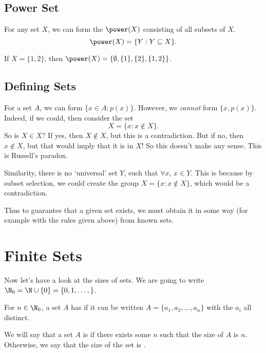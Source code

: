 \documentclass[a4paper]{scrreprt}
\begin{document}
\subsection{Power Set}
\vspace{\baselineskip}
\begin{definition}
	For any set $X$, we can form the  $\power(X)$ consisting of all subsets of $X$.
	$$
	\power(X) = \{Y : Y \subseteq X\}.
	$$
\end{definition}

\begin{example}
	If $X = \{1, 2\}$, then $\power(X) = \{\emptyset, \{1\}, \{2\}, \{1, 2\}\}$.
\end{example}


\subsection{Defining Sets}

For a set $A$, we can form $\{x \in A : p(x) \}$.
However, we \emph{cannot} form $\{x, p(x)\}$.
Indeed, if we could, then consider the set
$$
X = \{x : x \not\in X\}.
$$
So is $X \in X$? If yes, then $X \not\in X$, but this is a contradiction. But if no, then $x \not \in X$, but that would imply that it is in $X$! So this doesn't make any sense. This is Russell's paradox.

Similarity, there is no `universal' set $Y$, such that $\forall x$, $x \in Y$. This is because by subset selection, we could create the group $X = \{x : x \not\in X\}$, which would be a contradiction.

Thus to guarantee that a given set exists, we must obtain it in some way (for example with the rules given above) from known sets.

\section{Finite Sets}

Now let's have a look at the sizes of sets. We are going to write $\N_0 = \N \cup \{0\} = \{0, 1, \dots, \}$.

\begin{definition}[Size]
	For $n \in \N_0$, a set $A$ has  if it can be written $A = \{a_1, a_2, \dots, a_n\}$ with the $a_i$ all distinct.
\end{definition}

\begin{definition}[Finite]
	We will say that a set $A$ is  if there exists some $n$ such that the size of $A$ is $n$. Otherwise, we say that the size of the set is .
\end{definition}
\end{document}
